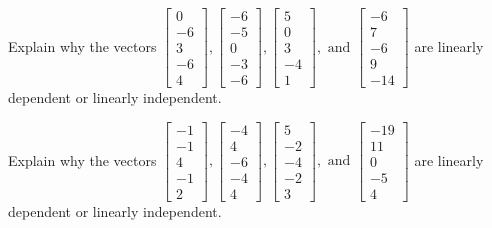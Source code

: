 \documentclass{article}
\begin{document}
\begin{exerciseStatement}
    Explain why the vectors \(\left[\begin{array}{r}
0 \\
-6 \\
3 \\
-6 \\
4
\end{array}\right] , \left[\begin{array}{r}
-6 \\
-5 \\
0 \\
-3 \\
-6
\end{array}\right] , \left[\begin{array}{r}
5 \\
0 \\
3 \\
-4 \\
1
\end{array}\right] , \text{ and } \left[\begin{array}{r}
-6 \\
7 \\
-6 \\
9 \\
-14
\end{array}\right]\) are linearly dependent or linearly independent.


  
\end{exerciseStatement}

\begin{exerciseStatement}
    Explain why the vectors \(\left[\begin{array}{r}
-1 \\
-1 \\
4 \\
-1 \\
2
\end{array}\right] , \left[\begin{array}{r}
-4 \\
4 \\
-6 \\
-4 \\
4
\end{array}\right] , \left[\begin{array}{r}
5 \\
-2 \\
-4 \\
-2 \\
3
\end{array}\right] , \text{ and } \left[\begin{array}{r}
-19 \\
11 \\
0 \\
-5 \\
4
\end{array}\right]\) are linearly dependent or linearly independent.


  
\end{exerciseStatement}
\end{document}
